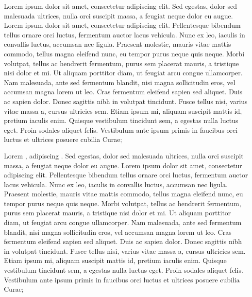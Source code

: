 \documentclass{article}
\begin{document}
\begin{pairs}
\begin{Rightside}
        \pend


        \pstart
Lorem ipsum dolor sit amet, consectetur adipiscing elit. Sed egestas, dolor sed malesuada ultrices, nulla orci suscipit massa, a feugiat neque dolor eu augue. Lorem ipsum dolor sit amet, consectetur adipiscing elit. Pellentesque bibendum tellus ornare orci luctus, fermentum auctor lacus vehicula. Nunc ex leo, iaculis in convallis luctus, accumsan nec ligula. Praesent molestie, mauris vitae mattis commodo, tellus magna eleifend nunc, eu tempor purus neque quis neque. Morbi volutpat, tellus ac hendrerit fermentum, purus sem placerat mauris, a tristique nisi dolor et mi. Ut aliquam porttitor diam, ut feugiat arcu congue ullamcorper. Nam malesuada, ante sed fermentum blandit, nisi magna sollicitudin eros, vel accumsan magna lorem ut leo. Cras fermentum eleifend sapien sed aliquet. Duis ac sapien dolor. Donec sagittis nibh in volutpat tincidunt. Fusce tellus nisi, varius vitae massa a, cursus ultricies sem. Etiam ipsum mi, aliquam suscipit mattis id, pretium iaculis enim. Quisque vestibulum tincidunt sem, a egestas nulla luctus eget. Proin sodales aliquet felis. Vestibulum ante ipsum primis in faucibus orci luctus et ultrices posuere cubilia Curae;

        \pend

\pausenumbering
\end{Rightside}
\end{pairs}
\Columns

    \resumenumbering





            \pstart
Lorem    ,  adipiscing . Sed egestas, dolor sed malesuada ultrices, nulla orci suscipit massa, a feugiat neque dolor eu augue. Lorem ipsum dolor sit amet, consectetur adipiscing elit. Pellentesque bibendum tellus ornare orci luctus, fermentum auctor lacus vehicula. Nunc ex leo, iaculis in convallis luctus, accumsan nec ligula. Praesent molestie, mauris vitae mattis commodo, tellus magna eleifend nunc, eu tempor purus neque quis neque. Morbi volutpat, tellus ac hendrerit fermentum, purus sem placerat mauris, a tristique nisi dolor et mi. Ut aliquam porttitor diam, ut feugiat arcu congue ullamcorper. Nam malesuada, ante sed fermentum blandit, nisi magna sollicitudin eros, vel accumsan magna lorem ut leo. Cras fermentum eleifend sapien sed aliquet. Duis ac sapien dolor. Donec sagittis nibh in volutpat tincidunt. Fusce tellus nisi, varius vitae massa a, cursus ultricies sem. Etiam ipsum mi, aliquam suscipit mattis id, pretium iaculis enim. Quisque vestibulum tincidunt sem, a egestas nulla luctus eget. Proin sodales aliquet felis. Vestibulum ante ipsum primis in faucibus orci luctus et ultrices posuere cubilia Curae;
\end{document}
